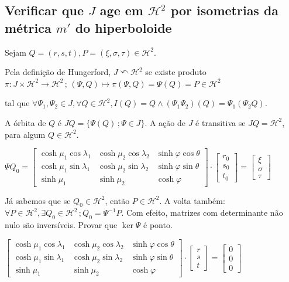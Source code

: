 \documentclass[10pt,a4paper]{article}
\begin{document}
		\subsection{Verificar que $J$ age em $\mathcal{H}^2$ por isometrias da m\'etrica $m'$ do hiperboloide}
		\begin{flushright}
		\end{flushright}

		Sejam $Q = (r, s, t), P = (\xi, \sigma, \tau) \in \mathcal{H}^2$.

		Pela defini\c{c}\~ao de Hungerford, $J \curvearrowleft \mathcal{H}^2$ se existe produto $\pi : J \times \mathcal{H}^2 \rightarrow \mathcal{H}^2 \,;\, (\Psi, Q) \mapsto \pi(\Psi,Q) = \Psi(Q) = P \in \mathcal{H}^2$

		tal que $\forall \Psi_1, \Psi_2 \in J, \forall Q \in \mathcal{H}^2, I(Q) = Q \wedge (\Psi_1 \Psi_2)(Q) = \Psi_1(\Psi_2 Q)$.

		A \'orbita de $Q$ \'e $J Q = \{ \Psi(Q) \,; \Psi \in J \} $. A a\c{c}\~ao de $J$ \'e transitiva se $J Q = \mathcal{H}^2$, para algum $Q \in \mathcal{H}^2$.

		 $\Psi Q_0 = \left[ \begin{matrix} \cosh \mu_1 \cos \lambda_1 & \cosh \mu_2 \cos \lambda_2 & \sinh \varphi \cos \theta \\ \cosh \mu_1 \sin \lambda_1 & \cosh \mu_2 \sin \lambda_2 & \sinh \varphi \sin \theta \\ \sinh \mu_1 & \sinh \mu_2 & \cosh \varphi \end{matrix} \right] \cdot \left[ \begin{matrix} r_0 \\ s_0 \\ t_0 \end{matrix} \right] = \left[ \begin{matrix} \xi \\ \sigma \\ \tau \end{matrix} \right]$

		 J\'a sabemos que se $Q_0 \in \mathcal{H}^2$, ent\~ao $P \in \mathcal{H}^2$. A volta tamb\'em: $\forall P \in \mathcal{H}^2, \exists Q_0 \in \mathcal{H}^2 \,; Q_0 = \Psi^{-1} P$. Com efeito, matrizes com determinante n\~ao nulo s\~ao invers\'iveis. Provar que $\ker \Psi$ \'e ponto.

		 $\left[ \begin{matrix} \cosh \mu_1 \cos \lambda_1 & \cosh \mu_2 \cos \lambda_2 & \sinh \varphi \cos \theta \\ \cosh \mu_1 \sin \lambda_1 & \cosh \mu_2 \sin \lambda_2 & \sinh \varphi \sin \theta \\ \sinh \mu_1 & \sinh \mu_2 & \cosh \varphi \end{matrix} \right] \cdot \left[ \begin{matrix} r \\ s \\ t \end{matrix} \right] = \left[ \begin{matrix} 0 \\ 0 \\ 0 \end{matrix} \right]$
\end{document}
